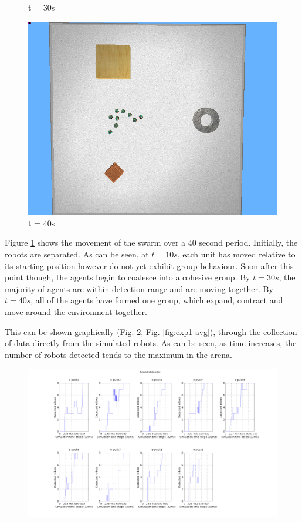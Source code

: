\begin{figure}[!h]
\begin{minipage}{.5\textwidth}
		\caption*{t = 30s}
		\label{fig:sw3}
	\end{minipage}%
	\begin{minipage}{.5\textwidth}
		\centering
		\includegraphics[width=.75\linewidth]{swarm_test_4}
		\caption*{t = 40s}
		\label{fig:sw4}
	\end{minipage}
		\label{fig:sw5}
\end{figure}

Figure \ref{fig:sw5} shows the movement of the swarm over a 40 second period. Initially, the robots are separated. As can be seen, at \(t = 10s\), each unit has moved relative to its starting position however do not yet exhibit group behaviour. Soon after this point though, the agents begin to coalesce into a cohesive group. By \(t = 30s\), the majority of agents are within detection range and are moving together. By \(t = 40s\), all of the agents have formed one group, which expand, contract and move around the environment together.

This can be shown graphically (Fig. \ref{fig:exp1}, Fig. \ref{fig:exp1-avg}), through the collection of data directly from the simulated robots. As can be seen, as time increases, the number of robots detected tends to the maximum in the arena.
\clearpage

\begin{figure}
	\centering
\begin{minipage}{1\textwidth}
	\centering
	\includegraphics[width=1\linewidth]{data1}
	\label{fig:exp1}
\end{minipage}%
\end{figure}
\clearpage


